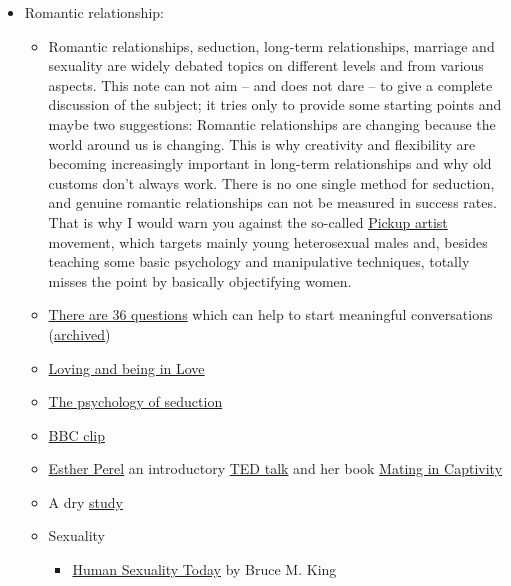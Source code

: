 \documentclass{article}
\begin{document}
\begin{itemize}
\begin{itemize}
    \end{itemize}
    \item Romantic relationship:
    \begin{itemize}
        \item Romantic relationships, seduction, long-term relationships, marriage and sexuality are widely debated topics on different levels and from various aspects. This note can not aim -- and does not dare -- to give a complete discussion of the subject; it tries only to provide some starting points and maybe two suggestions:
        Romantic relationships are changing because the world around us is changing. This is why creativity and flexibility are becoming increasingly important in long-term relationships and why old customs don't always work.
        There is no one single method for seduction, and genuine romantic relationships can not be measured in success rates. That is why I would warn you against the so-called \href{https://en.wikipedia.org/wiki/Pickup_artist}{Pickup artist} movement, which targets mainly young heterosexual males and, besides teaching some basic psychology and manipulative techniques, totally misses the point by basically objectifying women.
        \item \href{https://www.nytimes.com/2015/01/09/style/no-37-big-wedding-or-small.html}{There are 36 questions} which can help to start meaningful conversations (\href{https://web.archive.org/web/20210205043700/https://www.nytimes.com/2015/01/09/style/no-37-big-wedding-or-small.html}{archived})
        \item \href{https://www.healthline.com/health/being-in-love}{Loving and being in Love}
        \item \href{https://www.youtube.com/watch?v=3E46oWB4V0s}{The psychology of seduction}
        \item \href{https://www.bbc.com/reel/video/p07l3r3q/unpacking-the-psychology-of-seduction}{BBC clip}
        \item \href{https://en.wikipedia.org/wiki/Esther_Perel}{Esther Perel} an introductory \href{https://www.ted.com/talks/esther_perel_the_secret_to_desire_in_a_long_term_relationship}{TED talk} and her book \href{https://www.goodreads.com/book/show/27485.Mating_in_Captivity}{Mating in Captivity}
        \item A dry \href{https://www.ncbi.nlm.nih.gov/pmc/articles/PMC6650954/}{study}
        \item Sexuality
        \begin{itemize}
            \item \href{https://www.goodreads.com/book/show/10876862-human-sexuality-today}{Human Sexuality Today} by Bruce M. King

\end{itemize}
\end{itemize}
\end{itemize}
\end{document}
